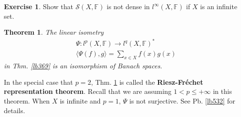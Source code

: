 \documentclass[12pt,b5paper,notitlepage]{article}
\theoremstyle{definition}
\newtheorem{exe}[df]{Exercise}
\theoremstyle{plain}
\newtheorem{thm}[df]{Theorem}
\newcommand{\mc}{\mathcal}
\newcommand{\bk}[1]{\langle {#1}\rangle}
\newcommand{\Fbb}{\mathbb F}
\numberwithin{equation}{section}
\begin{document}
\begin{exe}
Show that $\mc S(X,\Fbb)$ is not dense in $l^\infty(X,\Fbb)$ if $X$ is an infinite set.
\end{exe}

\begin{thm}\label{lb527}
The linear isometry
\begin{gather*}
\Psi:l^p(X,\Fbb)\rightarrow l^q(X,\Fbb)^*\\
\bk{\Psi(f),g}=\sum_{x\in X}f(x)g(x)
\end{gather*}
in Thm. \ref{lb369} is an isomorphism of Banach spaces.
\end{thm}

In the special case that $p=2$, Thm. \ref{lb527} is called the \textbf{Riesz-Fr\'echet representation theorem}.  Recall that we are assuming $1<p\leq+\infty$ in this theorem. When $X$ is infinite and $p=1$, $\Psi$ is not surjective. See Pb. \ref{lb532} for details.
\end{document}
